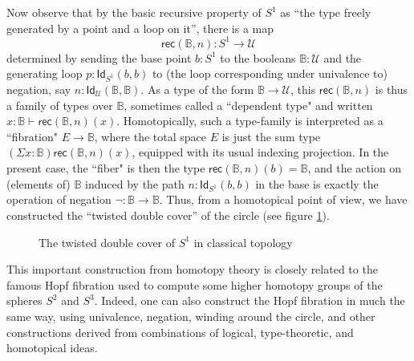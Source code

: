 \documentclass[11pt]{article}
\newcommand{\B}{\ensuremath{\mathbb{B}}}
\newcommand{\Id}{\mathsf{Id}}
\newcommand{\id}[1]{\Id_{#1}}
\newcommand{\rec}{\mathsf{rec}}
\newcommand{\U}{\ensuremath{\mathcal{U}}}
\theoremstyle{remark}
\theoremstyle{definition}
\begin{document}
Now observe that by the basic recursive property of $S^1$ as ``the type freely generated by a point and a loop on it'', there is a map $$\rec(\B,n): S^1 \to \U$$ determined by sending the base point $b:S^1$ to the booleans $\B:\U$ and the generating loop $p : \id{S^1}(b,b)$ to (the loop corresponding under univalence to) negation, say $n : \id{\U}(\B,\B)$.  As a type of the form $\B\to\U$, this $\rec(\B,n)$ is thus a family of types over $\B$, sometimes called a ``dependent type" and written $x:\B \vdash \rec(\B,n)(x)$.  Homotopically, such a type-family is interpreted as a ``fibration" $E\to\B$, where the total space $E$ is just the sum type $(\Sigma{x:\B})\rec(\B,n)(x)$, equipped with its usual indexing projection.  In the present case, the ``fiber" is then the type $\rec(\B,n)(b) = \B$, and the action on (elements of) $\B$ induced by the path $n: \id{S^1}(b,b)$ in the base is exactly the operation of negation $\neg : \B\to \B$.  Thus, from a homotopical point of view, we have constructed the ``twisted double cover'' of the circle (see figure \ref{fig:winding}).
\begin{figure}\centering
  \caption{The twisted double cover of $S^1$ in classical topology}\label{fig:winding}
\end{figure}
%
This important construction from homotopy theory is closely related to the famous Hopf fibration used to compute some higher homotopy groups of the spheres $S^2$ and $S^3$.  Indeed, one can also construct the Hopf fibration in much the same way, using univalence, negation, winding around the circle, and other constructions derived from combinations of logical, type-theoretic, and homotopical ideas.  
\end{document}
